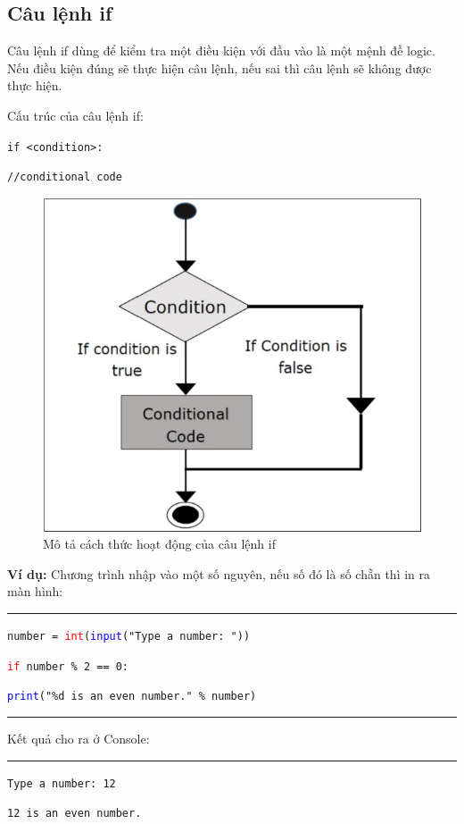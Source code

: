 \subsection{Câu lệnh if}
Câu lệnh if dùng để kiểm tra một điều kiện với đầu vào là một mệnh đề logic. Nếu điều kiện đúng sẽ thực hiện câu lệnh, nếu sai thì câu lệnh sẽ không được thực hiện.\par
Cấu trúc của câu lệnh if:\par
\texttt{if <condition>:}\par
\qquad \texttt{//conditional code}\par
\begin{figure}[h]
	\centering
	\includegraphics[width=0.7\linewidth]{img/if}
	\caption{Mô tả cách thức hoạt động của câu lệnh if}
\end{figure}
\newpage
\textbf{Ví dụ:} Chương trình nhập vào một số nguyên, nếu số đó là số chẵn thì in ra màn hình:\\
\rule{\linewidth}{0.2mm}\par
\begin{linenumbers}
	\texttt{number = \textcolor{red}{int}(\textcolor{blue}{input}("Type a number: "))}\par
	\texttt{\textcolor{red}{if} number \% 2 == 0:}\par
	\qquad \texttt{\textcolor{blue}{print}("\%d is an even number." \% number)}
\end{linenumbers}
\rule{\linewidth}{0.2mm}\par
\noindent
\resetlinenumber
Kết quả cho ra ở Console:\\
\rule{\linewidth}{0.2mm}\par
\begin{linenumbers}
	\texttt{Type a number: 12}\par
	\texttt{12 is an even number.}
\end{linenumbers}
